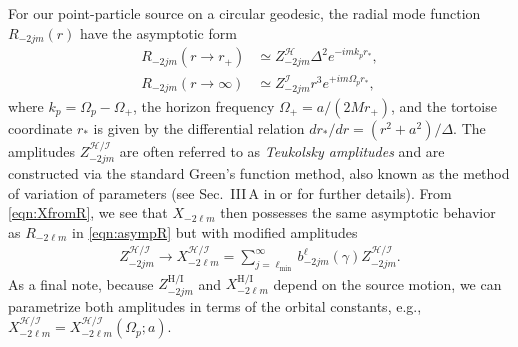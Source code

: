 \documentclass[%
 reprint,
 nofootinbib,
 amsmath,amssymb,
 aps,
 prd,
]{revtex4-2}
\begin{document}


For our point-particle source on a circular geodesic, the radial mode function $R_{-2jm}(r)$ have the asymptotic form
\begin{subequations} \label{eqn:asympR}
\begin{align}
    R_{-2jm}(r\rightarrow r_+) &\simeq Z^\mathcal{H}_{-2jm} \Delta^{2} e^{-im k_p r_*},
    \\ 
    R_{-2jm}(r\rightarrow \infty) &\simeq Z^\mathcal{I}_{-2jm} r^{3} e^{+im\Omega_p r_*},
\end{align}
\end{subequations}
where $k_p = \Omega_p - \Omega_+$, the horizon frequency $\Omega_+ = a/(2Mr_+)$, and the tortoise coordinate $r_*$ is given by the differential relation $dr_*/dr = (r^2+a^2)/\Delta$.
The amplitudes $Z^\mathcal{H/I}_{-2jm}$ are often referred to as \emph{Teukolsky amplitudes} and are constructed via the standard Green's function method, also known as the method of variation of parameters (see Sec.~III\,A in \cite{HughETC21} or \cite{DrasHugh06} for further details). From \eqref{eqn:XfromR}, we see that $X_{-2\ell m}$ then possesses the same asymptotic behavior as $R_{-2\ell m}$ in \eqref{eqn:asympR} but with modified amplitudes
\begin{align}
    Z^\mathcal{H/I}_{-2jm} \rightarrow X^\mathcal{H/I}_{-2\ell m} = \sum_{j=\ell_\mathrm{min}}^\infty b^\ell_{-2jm}(\gamma) Z^\mathcal{H/I}_{-2jm}.
\end{align}
As a final note, because $Z^\mathrm{H/I}_{-2jm}$ and  $X^\mathrm{H/I}_{-2\ell m}$ depend on the source motion, we can parametrize both amplitudes in terms of the orbital constants, e.g., $X^\mathcal{H/I}_{-2\ell m}= {X}^\mathcal{H/I}_{-2\ell m}(\Omega_p; a)$.
\end{document}
